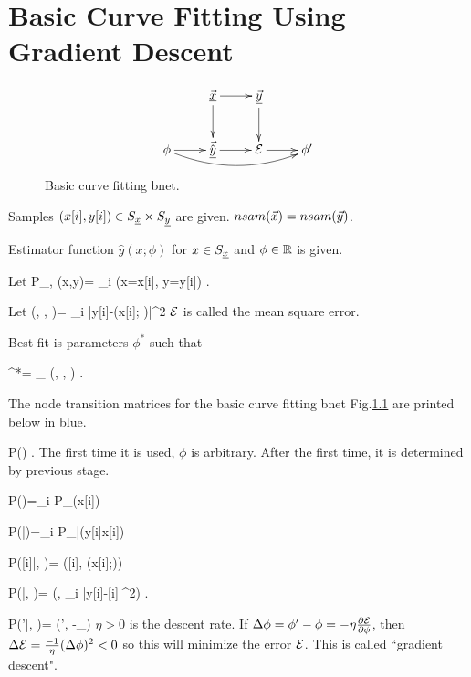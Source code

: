 \chapter{Basic Curve Fitting
Using Gradient Descent}
\label{chap-basic-fit}

\begin{figure}[h!]
\centering
$$\xymatrix{
&\vec{\rvx}\ar[d]\ar[r]&\ul{\vecy}
\ar[d]&\\
\phi\ar[r]\ar@/_1pc/[rrr]&
\vec{\hat{\rvy}}\ar[r]&\cale\ar[r]&\phi'
}$$
\caption{Basic curve fitting bnet.}
\label{fig-bfit}
\end{figure}


Samples 
$(x[i], y[i])\in S_{\underline{x}}\times S_{\underline{y}}$
are given. $nsam({\vec{x}})=nsam({\vec{y}})$.

Estimator function 
$\hat{y}(x; \phi)$
for $x\in S_{\underline{x}}$ and $\phi\in{ \mathbb{R}}$
is given.

Let 
\beq
P_{\rvx, \rvy}(x,y)=
\sum_i \indi(x=x[i], y=y[i])
\;.
\eeq


Let 
\beq
\cale(\vecx, \vecy, \phi)=
\sum_i
|y[i]-(x[i]; \phi)|^2
\;
\eeq
${\cal E}$ is called the mean square error.

Best fit is parameters $\phi^*$
such that

\beq 
\phi^*= \argmin_\phi
\cale(\vecx, \vecy, \phi)
\;.
\eeq

The node transition matrices for
the basic curve fitting bnet
 Fig.\ref{fig-bfit} are
printed below in blue.

\beq\color{blue}
P(\phi) 
\;.
\eeq
The first time
it is used, $\phi$ is arbitrary.
After the first time, it is determined 
by previous stage.

\beq\color{blue}
P(\vecx)=\prod_i P_\rvx(x[i])
\eeq

\beq\color{blue}
P(\vecy|\vecx)=\prod_i P_{\rvy|\rvx}(y[i]\cond x[i])
\eeq

\beq\color{blue}
P([i]|\phi, \vecx)=
\delta([i], (x[i];\phi))
\eeq


\beq\color{blue}
P(\cale|, \vecy)=
\delta(\cale,
\sum_i |y[i]-[i]|^2)
\;.
\eeq


\beq\color{blue}
P(\phi'|\phi, \cale)=
\delta(\phi',
\phi-\eta\partial_\phi\cale)
\eeq
$\eta>0$ is the descent rate.
If $\Delta \phi=\phi'-\phi=-\eta 
\frac{\partial{\cal E}}
{\partial \phi}$, then
 $\Delta {\cal E}=\frac{-1}{\eta}
(\Delta\phi)^2<0$  so this will
minimize the error
${\cal E}$.
This is called ``gradient descent".